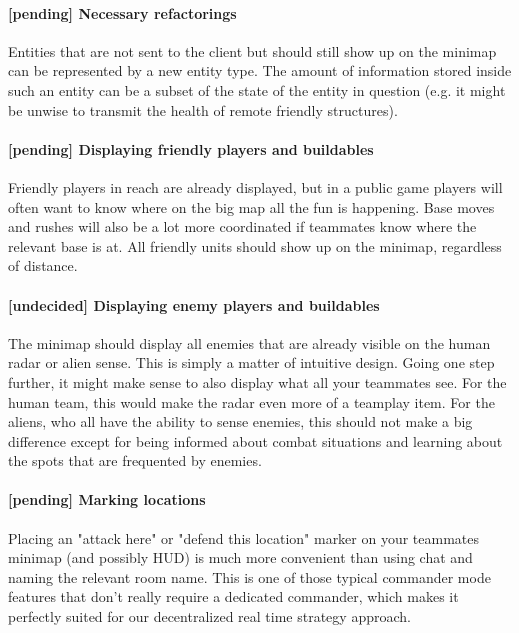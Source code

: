 \documentclass{scrartcl}
\newcommand{\undecided}[0]{\textcolor{undecided}{\textbf{[undecided] }}}
\newcommand{\pending}  [0]{\textcolor{pending}  {\textbf{[pending] }}}
\begin{document}
\paragraph{\pending Necessary refactorings}

Entities that are not sent to the client but should still show up on the minimap can be represented by a new entity type. The amount of information stored inside such an entity can be a subset of the state of the entity in question (e.g. it might be unwise to transmit the health of remote friendly structures).

\paragraph{\pending Displaying friendly players and buildables}

Friendly players in reach are already displayed, but in a public game players will often want to know where on the big map all the fun is happening. Base moves and rushes will also be a lot more coordinated if teammates know where the relevant base is at. All friendly units should show up on the minimap, regardless of distance.

\paragraph{\undecided Displaying enemy players and buildables}

The minimap should display all enemies that are already visible on the human radar or alien sense. This is simply a matter of intuitive design. Going one step further, it might make sense to also display what all your teammates see. For the human team, this would make the radar even more of a teamplay item. For the aliens, who all have the ability to sense enemies, this should not make a big difference except for being informed about combat situations and learning about the spots that are frequented by enemies.

\paragraph{\pending Marking locations}

Placing an "attack here" or "defend this location" marker on your teammates minimap (and possibly HUD) is much more convenient than using chat and naming the relevant room name. This is one of those typical commander mode features that don't really require a dedicated commander, which makes it perfectly suited for our decentralized real time strategy approach.
\end{document}
